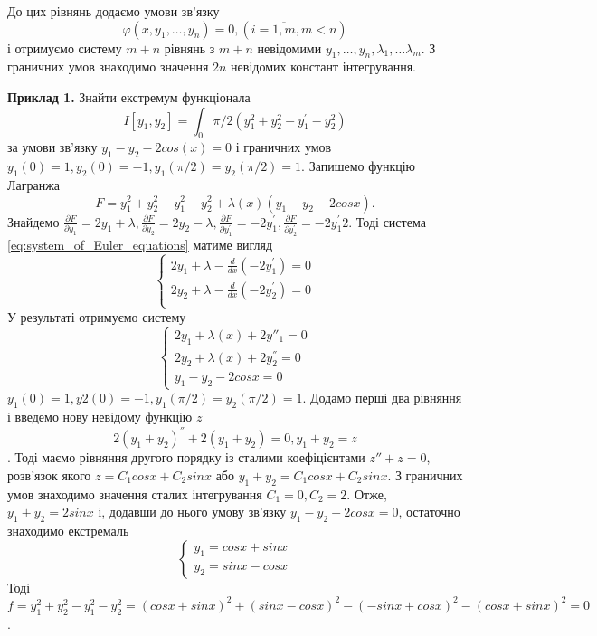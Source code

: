 \documentclass[a4paper]{article}
\begin{document}
	      До цих рівнянь додаємо умови зв’язку
	     \begin{equation}
	    	\varphi(x, y_1, \ldots, y_n) = 0, (i = \overline{1, m}, m < n)
	      \end{equation}
	      і отримуємо систему $m+n$ рівнянь з $m+n$ невідомими $ y_1, \ldots, y_n, \lambda_1, \ldots \lambda_m $.
	      З граничних умов знаходимо значення $2n$ невідомих констант інтегрування.

		\textbf{Приклад 1.} Знайти екстремум функціонала
		$$
			I[y_1, y_2] = \int_{0}{\pi/2} (y_1^{2} + y_2^{2} - y_1^{'} - y_2^{2})		
		$$
		за умови зв’язку $y_1 - y_2 - 2cos(x) = 0$ і граничних умов
		$y_1(0) = 1, y_2(0) = -1, y_1(\pi/2) = y_2(\pi/2) = 1$.
		Запишемо функцію Лагранжа
		$$F = y_1^2 + y_2^2 - y_1^2 - y_2^2 + \lambda(x)(y_1 - y_2 - 2cosx).$$
		Знайдемо $\frac{\partial F}{\partial y_1} = 2y_1 + \lambda,
		\frac{\partial F}{\partial y_2} = 2y_2 - \lambda,
		\frac{\partial F}{\partial y^{'}_1} = -2y^{'}_1,
		\frac{\partial F}{\partial y^{'}_2} = -2y^{'}_1 2$.
		Тоді система \eqref{eq:system_of_Euler_equations} матиме вигляд
		$$\begin{cases}
			2y_1 + \lambda - \frac{d}{dx}\left(-2y^{'}_1\right) = 0 \\
			2y_2 + \lambda - \frac{d}{dx}\left(-2y^{'}_2\right) = 0 \\
		\end{cases}$$
		У результаті отримуємо систему 
		$$\begin{cases}
			2y_1 + \lambda(x) + 2y''_1 = 0 \\
			2y_2 + \lambda(x) + 2y_2^{''} = 0 \\
			y_1 - y_2 - 2cosx = 0
		\end{cases}$$
		$y_1(0) = 1, y2(0) = -1, y_1(\pi/2) = y_2(\pi/2) = 1$.
		Додамо перші два рівняння і введемо нову невідому функцію $z$
		$$2(y_1 + y_2)^{''} + 2(y_1 + y_2) = 0, y_1 + y_2 = z$$.
		Тоді маємо рівняння другого порядку із сталими коефіцієнтами $z'' + z = 0$,
		розв’язок якого $z = C_1cosx + C_2sinx$ або $y_1 + y_2 = C_1cosx + C_2sinx$.
		З граничних умов  знаходимо значення сталих інтегрування $C_1 = 0, C_2 = 2$. Отже,
		$y_1 + y_2 = 2 sinx$ і, додавши до нього умову зв’язку $y_1 - y_2 - 2cosx = 0$, остаточно
		знаходимо екстремаль
		$$\begin{cases}
			y_1 = cosx + sinx \\
			y_2 = sinx - cosx
		\end{cases}$$
		Тоді $f = y_1^{2} + y_2^{2} - y_1^{2} - y_2^{2} = (cosx + sinx)^2 + (sinx - cosx)^2
		-(-sinx + cosx)^2 - (cosx + sinx)^2 = 0$.
		
\end{document}
